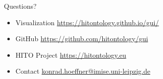 \documentclass[aspectratio=1610,12pt]{beamer}
\begin{document}
\begin{frame}[fragile]{Questions?}
\begin{itemize}
\vspace{0.5em}%
\item Visualization \url{https://hitontology.github.io/gui/}
\item GitHub \url{https://github.com/hitontology/gui}
\item HITO Project \url{https://hitontology.eu}
\item Contact \url{konrad.hoeffner@imise.uni-leipzig.de}
\end{itemize}
\end{frame}

\fi
\end{document}
